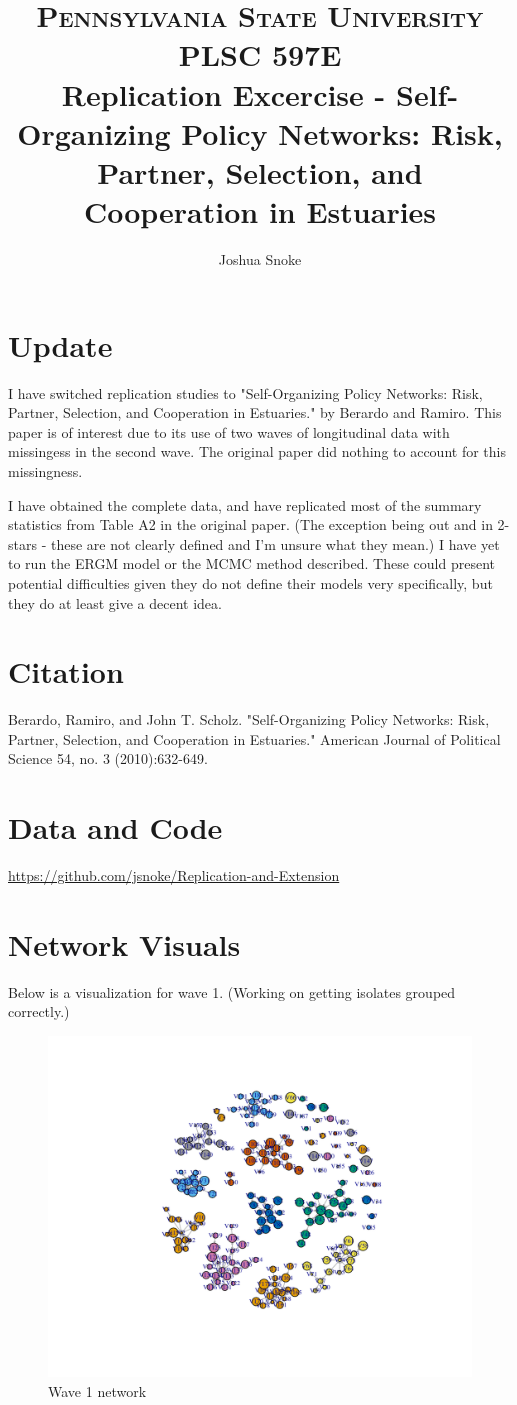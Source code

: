 \documentclass[12pt]{article} %
\title{
		\usefont{OT1}{bch}{b}{n}
		\normalfont \normalsize \textsc{Pennsylvania State University} \\ [25pt]
            \normalfont \normalsize \textsc{PLSC 597E} \\ [25pt]
		\Large Replication Excercise -  Self-Organizing Policy Networks: Risk, Partner, Selection, and Cooperation in Estuaries\\
}
\author{
		\normalfont 								\normalsize
        Joshua Snoke \\[-2pt]		\normalsize
}
\date{}
\numberwithin{equation}{section}		%
\numberwithin{figure}{section}			%
\numberwithin{table}{section}				%
\begin{document}
\maketitle

\section*{Update}
I have switched replication studies to "Self-Organizing Policy Networks: Risk, Partner, Selection, and Cooperation in Estuaries." by Berardo and Ramiro. This paper is of interest due to its use of two waves of longitudinal data with missingess in the second wave. The original paper did nothing to account for this missingness. 

I have obtained the complete data, and have replicated most of the summary statistics from Table A2 in the original paper. (The exception being out and in 2-stars - these are not clearly defined and I'm unsure what they mean.) I have yet to run the ERGM model or the MCMC method described. These could present potential difficulties given they do not define their models very specifically, but they do at least give a decent idea.

\section*{Citation}
Berardo, Ramiro, and John T. Scholz. "Self-Organizing Policy Networks: Risk, Partner, Selection, and Cooperation in Estuaries." American Journal of Political Science 54, no. 3 (2010):632-649.

\section*{Data and Code}
\url{https://github.com/jsnoke/Replication-and-Extension}

\section*{Network Visuals}
Below is a visualization for wave 1. (Working on getting isolates grouped correctly.)

\begin{figure}[!ht]
      \includegraphics[width=\linewidth]{wave1Plot.pdf}
      \caption{Wave 1 network}\label{fig:x1}
\end{figure}
\end{document}
